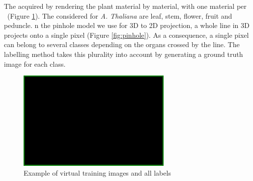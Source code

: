 The  acquired by rendering the plant material by material, with one material per
~(Figure \ref{fig:plants}). The
 considered for \emph{A. Thaliana} are leaf, stem, flower,
fruit and peduncle. n the pinhole model \cite{} we use for 3D to 2D
projection, a whole line in 3D projects onto a single pixel (Figure
\ref{fig:pinhole}). As a consequence, a single pixel can belong to
several classes depending on the organs crossed by the line. The
labelling method takes this plurality into account by generating a
ground truth image for each class.

\begin{figure}[h]
    \centering \includegraphics[width=0.1\linewidth]{figures/blank.png}
    \caption{Example of virtual training images and all labels}
    \label{fig:plants}
\end{figure}







